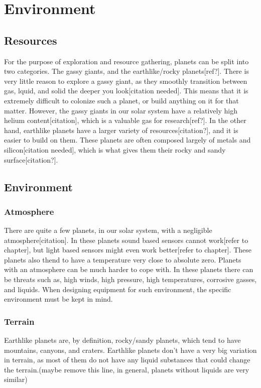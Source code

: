 \clearpage
\section{Environment}
\subsection{Resources}
For the purpose of exploration and resource gathering, planets can be split into two categories. The gassy giants, and the earthlike/rocky planets[ref?].
There is very little reason to explore a gassy giant, as they smoothly transition between gas, lquid, and solid the deeper you look[citation needed]. This means that it is extremely difficult to colonize such a planet, or build anything on it for that matter. However, the gassy giants in our solar system have a relatively high helium content[citation], which is a valuable gas for research[ref?]. 
In the other hand, earthlike planets have a larger variety of resources[citation?], and it is easier to build on them. These planets are often composed largely of metals and silicon[citation needed], which is what gives them their rocky and sandy surface[citation?].


\subsection{Environment}
\subsubsection{Atmosphere}
There are quite a few planets, in our solar system, with a negligible atmosphere[citation]. In these planets sound based sensors cannot work[refer to chapter], but light based sensors might even work better[refer to chapter]. These planets also thend to have a temperature very close to absolute zero. %
Planets with an atmosphere can be much harder to cope with. In these planets there can be threats such as, high winds, high pressure, high temperatures, corrosive gasses, and liquids. When designing equipment for such environment, the specific environment must be kept in mind.

\subsubsection{Terrain}
Earthlike planets are, by definition, rocky/sandy planets, which tend to have mountains, canyons, and craters.
Earthlike planets don't have a very big variation in terrain, as most of them do not have any liquid substances that could change the terrain.(maybe remove this line, in general, planets without liquids are very similar)


